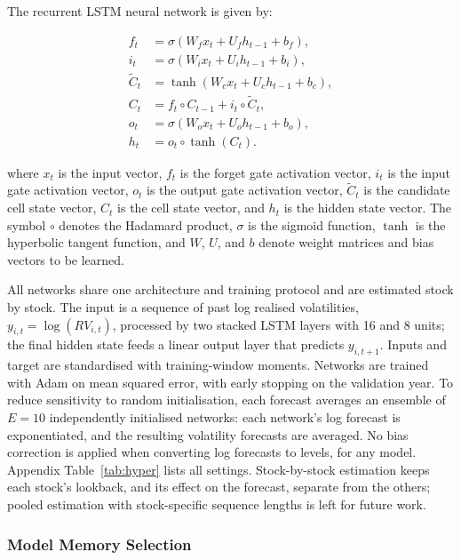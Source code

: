 \documentclass[12pt]{article}
\begin{document}
The recurrent LSTM neural network is given by:

\begin{equation}
\begin{aligned}
f_t &= \sigma(W_f x_t + U_f h_{t-1} + b_f), \\
i_t &= \sigma(W_i x_t + U_i h_{t-1} + b_i), \\
\tilde{C}_t &= \tanh(W_c x_t + U_c h_{t-1} + b_c), \\
C_t &= f_t \circ C_{t-1} + i_t \circ \tilde{C}_t, \\
o_t &= \sigma(W_o x_t + U_o h_{t-1} + b_o), \\
h_t &= o_t \circ \tanh (C_t).
\end{aligned}
\end{equation}

\noindent where \(x_t\) is the input vector, \(f_t\) is the forget gate activation vector, \(i_t\) is the input gate activation vector, \(o_t\) is the output gate activation vector, \(\tilde{C}_t\) is the candidate cell state vector, \(C_t\) is the cell state vector, and \(h_t\) is the hidden state vector. The symbol \(\circ\) denotes the Hadamard product, \(\sigma\) is the sigmoid function, \(\tanh\) is the hyperbolic tangent function, and \(W\), \(U\), and \(b\) denote weight matrices and bias vectors to be learned.

All networks share one architecture and training protocol and are estimated stock by stock. The input is a sequence of past log realised volatilities, $y_{i,t}=\log(RV_{i,t})$, processed by two stacked LSTM layers \parencite{hochreiter-1997} with 16 and 8 units; the final hidden state feeds a linear output layer that predicts $y_{i,t+1}$. Inputs and target are standardised with training-window moments. Networks are trained with Adam on mean squared error, with early stopping on the validation year. To reduce sensitivity to random initialisation, each forecast averages an ensemble of $E=10$ independently initialised networks: each network's log forecast is exponentiated, and the resulting volatility forecasts are averaged. No bias correction is applied when converting log forecasts to levels, for any model. Appendix Table~\ref{tab:hyper} lists all settings. Stock-by-stock estimation keeps each stock's lookback, and its effect on the forecast, separate from the others; pooled estimation with stock-specific sequence lengths is left for future work.

\subsubsection{Model Memory Selection}
\label{sec:memory}
\end{document}
